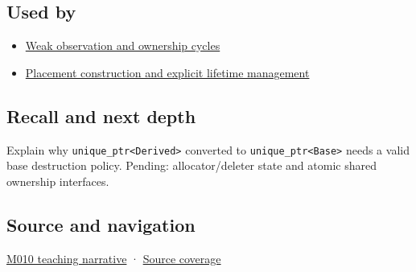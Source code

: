 \subsection{Used by}\label{used-by}

\begin{itemize}
\tightlist
\item
  \hyperref[appendix-b9548675eb2b]{Weak observation and ownership cycles}
\item
  \hyperref[appendix-f56c3e43fd4e]{Placement construction and explicit lifetime management}
\end{itemize}

\subsection{Recall and next depth}\label{recall-and-next-depth}

Explain why \texttt{unique\_ptr\textless{}Derived\textgreater{}} converted to \texttt{unique\_ptr\textless{}Base\textgreater{}} needs a valid base destruction policy. Pending: allocator/deleter state and atomic shared ownership interfaces.

\subsection{Source and navigation}\label{source-and-navigation}

\href{Continuous\%20Notes/Computing\%20Foundations\%20-\%20From\%20Bits\%20to\%20C++\%20and\%20Systems\%20APIs\#Exclusive\%20ownership:\%20\%60unique_ptr\%60\%20makes\%20transfer\%20visible}{M010 teaching narrative} · \hyperref[appendix-fd090d982a15]{Source coverage}
